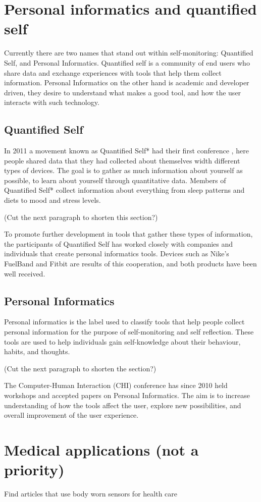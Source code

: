 \section{Personal informatics and quantified self}
Currently there are two names that stand out within self-monitoring: Quantified Self, and Personal Informatics. Quantified self is a community of end users who share data and exchange experiences with tools that help them collect information. Personal Informatics on the other hand is academic and developer driven, they desire to understand what makes a good tool, and how the user interacts with such technology.

\subsection{Quantified Self}
In 2011 a movement known as Quantified Self*\cite{quantifiedSelf} had their first conference \cite{bodyHackers}, here people shared data that they had collected about themselves width different types of devices. The goal is to gather as much information about yourself as possible, to learn about yourself through quantitative data. Members of Quantified Self* collect information about everything from sleep patterns and diets to mood and stress levels.

(Cut the next paragraph to shorten this section?)

To promote further development in tools that gather these types of information, the participants of Quantified Self has worked closely with companies and individuals that create personal informatics tools. Devices such as Nike's FuelBand \cite{fuelBand} and Fitbit \cite{fitBit} are results of this cooperation, and both products have been well received.

\subsection{Personal Informatics}
Personal informatics is the label used to classify tools that help people collect personal information for the purpose of self-monitoring and self reflection. These tools are used to help individuals gain self-knowledge about their behaviour, habits, and thoughts\cite{personalInformatics}.

(Cut the next paragraph to shorten the section?)

The Computer-Human Interaction (CHI) conference has since 2010 \cite{chi2010} held workshops and accepted papers on Personal Informatics. The aim is to increase understanding of how the tools affect the user, explore new possibilities, and overall improvement of the user experience.

\section{Medical applications (not a priority)}
Find articles that use body worn sensors for health care